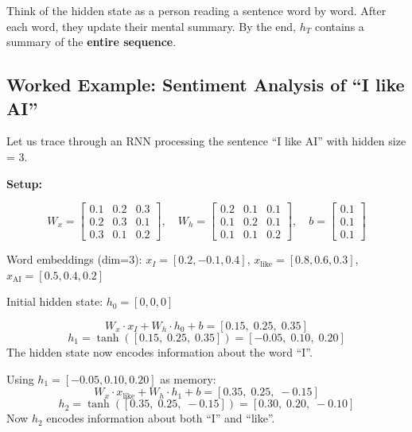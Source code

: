 \documentclass[11pt,a4paper]{article}
\begin{document}
\begin{tcolorbox}[intuitionbox={Intuition}]
Think of the hidden state as a person reading a sentence word by word. After each word, they update their mental summary. By the end, $h_T$ contains a summary of the \textbf{entire sequence}.
\end{tcolorbox}

\subsection{Worked Example: Sentiment Analysis of ``I like AI''}

Let us trace through an RNN processing the sentence ``I like AI'' with hidden size = 3.

\medskip\noindent\textbf{Setup:}

\[
W_x = \begin{bmatrix} 0.1 & 0.2 & 0.3 \\ 0.2 & 0.3 & 0.1 \\ 0.3 & 0.1 & 0.2 \end{bmatrix}, \quad
W_h = \begin{bmatrix} 0.2 & 0.1 & 0.1 \\ 0.1 & 0.2 & 0.1 \\ 0.1 & 0.1 & 0.2 \end{bmatrix}, \quad
b = \begin{bmatrix} 0.1 \\ 0.1 \\ 0.1 \end{bmatrix}
\]

Word embeddings (dim=3): $x_I = [0.2, -0.1, 0.4]$,\; $x_{\text{like}} = [0.8, 0.6, 0.3]$,\; $x_{\text{AI}} = [0.5, 0.4, 0.2]$

Initial hidden state: $h_0 = [0, 0, 0]$

\medskip
\begin{tcolorbox}[colback=white, colframe=alfaisalgreen, boxrule=0.5pt, title={\textbf{Step 1 --- Processing ``I''}}]
\[
W_x \cdot x_I + W_h \cdot h_0 + b = [0.15,\; 0.25,\; 0.35]
\]
\[
h_1 = \tanh([0.15,\; 0.25,\; 0.35]) = [-0.05,\; 0.10,\; 0.20]
\]
The hidden state now encodes information about the word ``I''.
\end{tcolorbox}

\begin{tcolorbox}[colback=white, colframe=alfaisalgreen, boxrule=0.5pt, title={\textbf{Step 2 --- Processing ``like''}}]
Using $h_1 = [-0.05, 0.10, 0.20]$ as memory:
\[
W_x \cdot x_{\text{like}} + W_h \cdot h_1 + b = [0.35,\; 0.25,\; -0.15]
\]
\[
h_2 = \tanh([0.35,\; 0.25,\; -0.15]) = [0.30,\; 0.20,\; -0.10]
\]
Now $h_2$ encodes information about both ``I'' and ``like''.
\end{tcolorbox}
\end{document}
